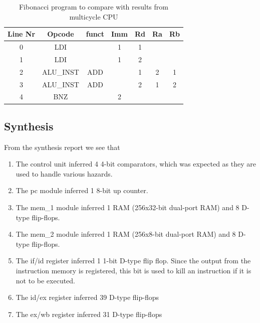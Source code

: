 \documentclass[11pt]{report}
\begin{document}
\begin{table}[htbp]
  \centering
  \begin{tabular}{|c|c|c|c|c|c|c|}
    \hline
    Line Nr &	Opcode		&	funct	&	Imm	&	Rd	&	Ra	&	Rb	\\\hline
    	0	&	LDI			&			&	1	&	1	&		&		\\\hline
    	1	&	LDI			&			&	1	&	2	&		&		\\\hline
    	2	&	ALU\_INST	&	ADD		&		&	1	&	2	&	1	\\\hline
    	3	&	ALU\_INST	&	ADD		&		&	2	&	1	&	2	\\\hline
    	4	&	BNZ			&			&	2	&		&		&		\\\hline
  \end{tabular}
  \caption{Fibonacci program to compare with results from multicycle CPU}
  \label{tab:fibonacci}
\end{table}




\subsection*{Synthesis}

From the synthesis report we see that
\begin{enumerate}

\item The control unit inferred 4 4-bit comparators, which was expected as they are used 
to handle various hazards.

\item The pc module inferred 1 8-bit up counter.

\item The mem\_1 module inferred 1 RAM (256x32-bit dual-port RAM) and 8 D-type flip-flops.

\item The mem\_2 module inferred 1 RAM (256x8-bit dual-port RAM) and 8 D-type flip-flops.

\item The if/id register inferred 1 1-bit D-type flip flop. Since the output from the 
instruction memory is registered, this bit is used to kill an instruction if it is not
to be executed.

\item The id/ex register inferred 39 D-type flip-flops

\item The ex/wb register inferred 31 D-type flip-flops

\end{enumerate}
\end{document}
